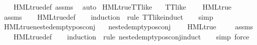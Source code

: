 \begin{isabellebody}
%
\isadelimproof
\ \ %
\endisadelimproof
%
\isatagproof
{}\isamarkupfalse%
\ HML{\isacharunderscore}{\kern0pt}true{\isacharunderscore}{\kern0pt}def\ assms\ \isamarkupfalse%
\ auto%
\endisatagproof
{\isafoldproof}%
%
\isadelimproof
\isanewline
%
\endisadelimproof
\isanewline
{}\isamarkupfalse%
\ HML{\isacharunderscore}{\kern0pt}true{\isacharunderscore}{\kern0pt}TT{\isacharunderscore}{\kern0pt}like{\isacharcolon}{\kern0pt}\isanewline
\ \ \ {\isachardoublequoteopen}TT{\isacharunderscore}{\kern0pt}like\ {\isasymphi}{\isachardoublequoteclose}\isanewline
\ \ \ {\isachardoublequoteopen}HML{\isacharunderscore}{\kern0pt}true\ {\isasymphi}{\isachardoublequoteclose}\isanewline
%
\isadelimproof
\ \ %
\endisadelimproof
%
\isatagproof
{}\isamarkupfalse%
\ assms\isanewline
\ \ \isamarkupfalse%
\ HML{\isacharunderscore}{\kern0pt}true{\isacharunderscore}{\kern0pt}def\isanewline
\ \ \isamarkupfalse%
\ {\isacharparenleft}{\kern0pt}induction\ {\isasymphi}\ rule{\isacharcolon}{\kern0pt}\ TT{\isacharunderscore}{\kern0pt}like{\isachardot}{\kern0pt}induct{\isacharparenright}{\kern0pt}\isanewline
\ \ \isamarkupfalse%
\ simp{\isacharplus}{\kern0pt}%
\endisatagproof
{\isafoldproof}%
%
\isadelimproof
\isanewline
%
\endisadelimproof
\isanewline
{}\isamarkupfalse%
\ HML{\isacharunderscore}{\kern0pt}true{\isacharunderscore}{\kern0pt}nested{\isacharunderscore}{\kern0pt}empty{\isacharunderscore}{\kern0pt}pos{\isacharunderscore}{\kern0pt}conj{\isacharcolon}{\kern0pt}\isanewline
\ \ \ {\isachardoublequoteopen}nested{\isacharunderscore}{\kern0pt}empty{\isacharunderscore}{\kern0pt}pos{\isacharunderscore}{\kern0pt}conj\ {\isasymphi}{\isachardoublequoteclose}\isanewline
\ \ \ {\isachardoublequoteopen}HML{\isacharunderscore}{\kern0pt}true\ {\isasymphi}{\isachardoublequoteclose}\isanewline
%
\isadelimproof
\ \ %
\endisadelimproof
%
\isatagproof
{}\isamarkupfalse%
\ assms\isanewline
\ \ \isamarkupfalse%
\ HML{\isacharunderscore}{\kern0pt}true{\isacharunderscore}{\kern0pt}def\isanewline
\ \ \isamarkupfalse%
\ {\isacharparenleft}{\kern0pt}induction\ {\isasymphi}\ rule{\isacharcolon}{\kern0pt}\ nested{\isacharunderscore}{\kern0pt}empty{\isacharunderscore}{\kern0pt}pos{\isacharunderscore}{\kern0pt}conj{\isachardot}{\kern0pt}induct{\isacharparenright}{\kern0pt}\isanewline
\ \ \isamarkupfalse%
\ {\isacharparenleft}{\kern0pt}simp{\isacharcomma}{\kern0pt}\ force{\isacharparenright}{\kern0pt}%

\end{isabellebody}

